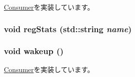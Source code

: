 \hyperlink{classConsumer_a3ea5f7af5db62cc24f4e40df9ea5c971}{Consumer}を実装しています。\hypertarget{classThrottle_ac6e9ed2d674c28f5dee840012356e9ab}{
\subsubsection[{regStats}]{\setlength{\rightskip}{0pt plus 5cm}void regStats (std::string {\em name})}}
\label{classThrottle_ac6e9ed2d674c28f5dee840012356e9ab}
\hypertarget{classThrottle_ae674290a26ecbd622c5160e38e8a4fe9}{
\subsubsection[{wakeup}]{\setlength{\rightskip}{0pt plus 5cm}void wakeup ()}}
\label{classThrottle_ae674290a26ecbd622c5160e38e8a4fe9}


\hyperlink{classConsumer_a623e3e7d1b1c725d70009f7b01a421b9}{Consumer}を実装しています。



